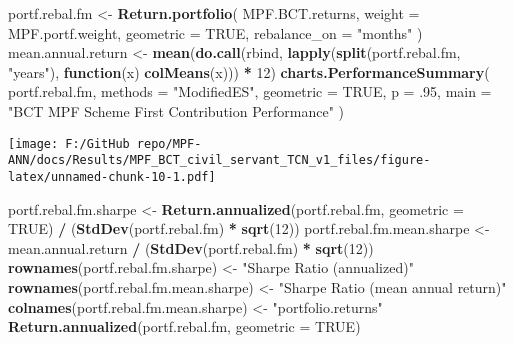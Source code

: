 \documentclass[
]{article}
\newenvironment{Shaded}{\begin{snugshade}}{\end{snugshade}}
\newcommand{\ControlFlowTok}[1]{\textcolor[rgb]{0.13,0.29,0.53}{\textbf{#1}}}
\newcommand{\DataTypeTok}[1]{\textcolor[rgb]{0.13,0.29,0.53}{#1}}
\newcommand{\DecValTok}[1]{\textcolor[rgb]{0.00,0.00,0.81}{#1}}
\newcommand{\FloatTok}[1]{\textcolor[rgb]{0.00,0.00,0.81}{#1}}
\newcommand{\KeywordTok}[1]{\textcolor[rgb]{0.13,0.29,0.53}{\textbf{#1}}}
\newcommand{\NormalTok}[1]{#1}
\newcommand{\OperatorTok}[1]{\textcolor[rgb]{0.81,0.36,0.00}{\textbf{#1}}}
\newcommand{\OtherTok}[1]{\textcolor[rgb]{0.56,0.35,0.01}{#1}}
\newcommand{\StringTok}[1]{\textcolor[rgb]{0.31,0.60,0.02}{#1}}
\begin{document}
\begin{Shaded}
\begin{Highlighting}[]
\NormalTok{portf.rebal.fm <-}\StringTok{ }\KeywordTok{Return.portfolio}\NormalTok{(}
\NormalTok{  MPF.BCT.returns,}
  \DataTypeTok{weight =}\NormalTok{ MPF.portf.weight,}
  \DataTypeTok{geometric =} \OtherTok{TRUE}\NormalTok{,}
  \DataTypeTok{rebalance_on =} \StringTok{"months"}
\NormalTok{)}
\NormalTok{mean.annual.return <-}
\StringTok{  }\KeywordTok{mean}\NormalTok{(}\KeywordTok{do.call}\NormalTok{(rbind, }\KeywordTok{lapply}\NormalTok{(}\KeywordTok{split}\NormalTok{(portf.rebal.fm, }\StringTok{"years"}\NormalTok{), }\ControlFlowTok{function}\NormalTok{(x)}
    \KeywordTok{colMeans}\NormalTok{(x))) }\OperatorTok{*}\StringTok{ }\DecValTok{12}\NormalTok{)}
\KeywordTok{charts.PerformanceSummary}\NormalTok{(}
\NormalTok{  portf.rebal.fm,}
  \DataTypeTok{methods =} \StringTok{"ModifiedES"}\NormalTok{,}
  \DataTypeTok{geometric =} \OtherTok{TRUE}\NormalTok{,}
  \DataTypeTok{p =} \FloatTok{.95}\NormalTok{,}
  \DataTypeTok{main =} \StringTok{"BCT MPF Scheme First Contribution Performance"}
\NormalTok{)}
\end{Highlighting}
\end{Shaded}

\texttt{[image: F:/GitHub repo/MPF-ANN/docs/Results/MPF\_BCT\_civil\_servant\_TCN\_v1\_files/figure-latex/unnamed-chunk-10-1.pdf]}

\begin{Shaded}
\begin{Highlighting}[]
\NormalTok{portf.rebal.fm.sharpe <-}
\StringTok{  }\KeywordTok{Return.annualized}\NormalTok{(portf.rebal.fm, }\DataTypeTok{geometric =} \OtherTok{TRUE}\NormalTok{) }\OperatorTok{/}\StringTok{ }\NormalTok{(}\KeywordTok{StdDev}\NormalTok{(portf.rebal.fm) }\OperatorTok{*}\StringTok{ }\KeywordTok{sqrt}\NormalTok{(}\DecValTok{12}\NormalTok{))}
\NormalTok{portf.rebal.fm.mean.sharpe <-}
\StringTok{  }\NormalTok{mean.annual.return }\OperatorTok{/}\StringTok{ }\NormalTok{(}\KeywordTok{StdDev}\NormalTok{(portf.rebal.fm) }\OperatorTok{*}\StringTok{ }\KeywordTok{sqrt}\NormalTok{(}\DecValTok{12}\NormalTok{))}
\KeywordTok{rownames}\NormalTok{(portf.rebal.fm.sharpe) <-}\StringTok{ "Sharpe Ratio (annualized)"}
\KeywordTok{rownames}\NormalTok{(portf.rebal.fm.mean.sharpe) <-}
\StringTok{  "Sharpe Ratio (mean annual return)"}
\KeywordTok{colnames}\NormalTok{(portf.rebal.fm.mean.sharpe) <-}\StringTok{ "portfolio.returns"}
\KeywordTok{Return.annualized}\NormalTok{(portf.rebal.fm, }\DataTypeTok{geometric =} \OtherTok{TRUE}\NormalTok{)}
\end{Highlighting}
\end{Shaded}
\end{document}
